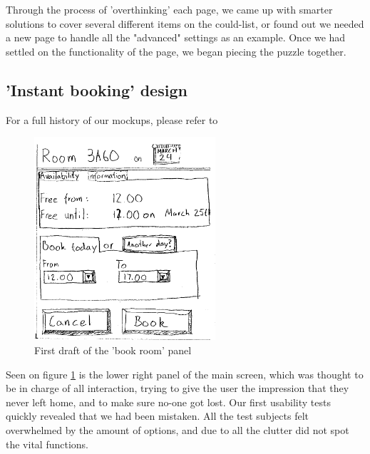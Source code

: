 Through the process of 'overthinking' each page, we came up with smarter solutions to cover several different items on the could-list, or found out we needed a new page to handle all the "advanced" settings as an example. Once we had settled on the functionality of the page, we began piecing the puzzle together.



\subsection{'Instant booking' design}
For a full history of our mockups, please refer to %

\begin{figure}[htb]
\begin{center}
\leavevmode
\includegraphics[width=0.6\textwidth]{images/bookRoomMockup}
\end{center}
\caption{First draft of the 'book room' panel}
\label{fig:book_room_mockup}
\end{figure}

Seen on figure \ref{fig:book_room_mockup} is the lower right panel of the main screen, which was thought to be in charge of all interaction, trying to give the user the impression that they never left home, and to make sure no-one got lost. Our first usability tests quickly revealed that we had been mistaken. All the test subjects felt overwhelmed by the amount of options, and due to all the clutter did not spot the vital functions.

